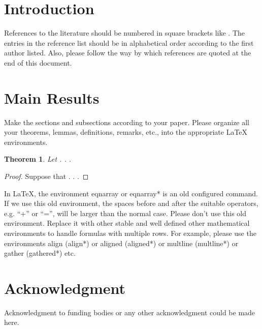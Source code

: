 \documentclass[10pt,a4paper]{article}
\newtheorem{theorem}{Theorem}[section]
\begin{document}
\section{Introduction}

References to the literature should be numbered in square brackets like \cite{Burns-1995,debonothesis}.
The entries in the reference list should be in alphabetical order according to the first author listed. Also, please follow the way by which references are quoted at the end of this document.



\section{Main Results}\label{sec-2}


Make the sections and subsections according to your paper. Please organize all your theorems, lemmas, definitions, remarks, etc., into the appropriate LaTeX environments.

\begin{theorem}\label{thm-1}
Let
.
.
.
\end{theorem}

\begin{proof}
Suppose that	
    .
	.
	.
\end{proof}

In LaTeX, the environment eqnarray or eqnarray* is an old configured command. If we use this old environment, the spaces before and after the suitable operators, e.g. ``+'' or ``='', will be larger than the normal case. Please don't use this old environment. Replace it with other stable and well defined other mathematical environments to handle formulas with multiple rows. For example, please use the environments align (align*) or aligned (aligned*) or multline (multline*) or gather (gathered*) etc.



\section*{Acknowledgment}

Acknowledgment to funding bodies or any other acknowledgment could be made here.


\footnotesize
\end{document}
